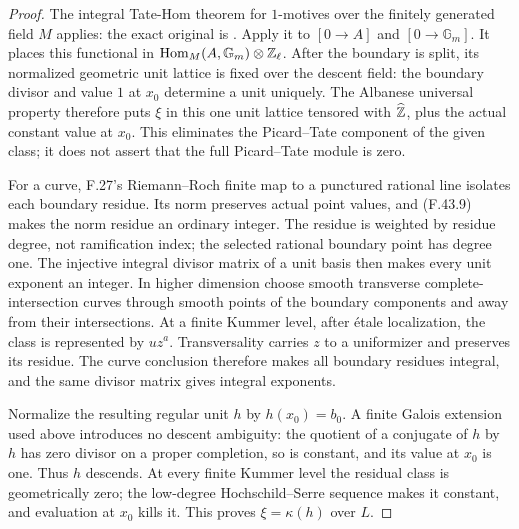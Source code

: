 \begin{proof}
The integral Tate-Hom theorem for $1$-motives
over the finitely generated field $M$ applies:
the exact original is
\citet[Theorem~4.3(ii), p.~676]{F_Jannsen1995}.
Apply it to $[0\to A]$ and $[0\to\mathbb G_m]$.
It places this functional in
$\operatorname{Hom}_M(A,\mathbb G_m)\otimes\mathbb Z_\ell$.
After the boundary is split, its normalized
geometric unit lattice is fixed over the
descent field: the boundary divisor and
value $1$ at $x_0$ determine a unit uniquely.
The Albanese universal property therefore
puts $\xi$ in this one unit lattice tensored
with $\widehat{\mathbb Z}$, plus the actual constant
value at $x_0$.
This eliminates the Picard--Tate component
of the given class; it does not assert that
the full Picard--Tate module is zero.

For a curve, F.27's Riemann--Roch finite
map to a punctured rational line isolates
each boundary residue. Its norm preserves
actual point values, and (F.43.9) makes
the norm residue an ordinary integer.
The residue is weighted by residue degree,
not ramification index; the selected
rational boundary point has degree one.
The injective integral divisor matrix
of a unit basis then makes every unit
exponent an integer.
In higher dimension choose smooth transverse
complete-intersection curves through smooth
points of the boundary components and
away from their intersections. At a finite
Kummer level, after étale localization,
the class is represented by $u z^a$.
Transversality carries $z$ to a uniformizer
and preserves its residue. The curve
conclusion therefore makes all boundary
residues integral, and the same divisor
matrix gives integral exponents.

Normalize the resulting regular unit $h$
by $h(x_0)=b_0$. A finite Galois extension
used above introduces no descent ambiguity:
the quotient of a conjugate of $h$ by $h$
has zero divisor on a proper completion,
so is constant, and its value at $x_0$ is
one. Thus $h$ descends. At every finite
Kummer level the residual class is
geometrically zero; the low-degree
Hochschild--Serre sequence makes it
constant, and evaluation at $x_0$ kills it.
This proves $\xi=\kappa(h)$ over $L$.


\end{proof}
